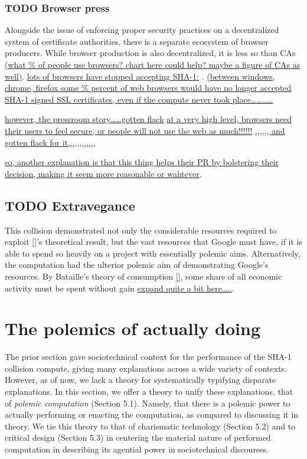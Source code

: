\documentclass[sigconf]{acmart}
\begin{document}
\subsubsection{{\bfseries\sffamily TODO} Browser press}
\label{sec:orgc9df00d}

Alongside the issue of enforcing proper security practices on a decentralized system of certificate authorities, 
there is a separate ecosystem of browser producers.
While browser production is also decentralized, it is less so than CAs
\uline{(what \% of people use browsers? chart here could help? maybe a figure of CAs as well)}.
\uline{lots of browsers have stopped accepting SHA-1:}
\cite{Sleevi2014,Mozilla2017}.
\uline{(between windows, chrome, firefox some \% percent of web browsers would have no longer accepted SHA-1 signed SSL certificates, even if the compute never took place\ldots{}\ldots{}\ldots{}\ldots{}}

\uline{however, the pressroom story\ldots{}\ldots{}gotten flack}
\uline{at a very high level, browsers need their users to feel secure, or people will not use the web as much!!!!!!}
\uline{,,,,,, and gotten flack for it,,,,,,,,,,,,}

\uline{so, another explanation is that this thing helps their PR by bolstering their decision, making it seem more reasonable or wahtever}.

\subsection{{\bfseries\sffamily TODO} Extravegance}
\label{sec:org3dd6240}

This collision demonstrated not only the considerable resources required to exploit \uline{[]}'s theoretical result,
but the vast resources that Google must have, if it is able to spend so heavily on a project with essentially polemic aims.
Alternatively, the computation had the ulterior polemic aim of demonstrating Google's resources.
By Bataille's theory of consumption \uline{[]}, some share of all economic activity must be spent without gain \uline{expand quite a bit here\ldots{}..}.


\section{The polemics of actually doing}
\label{sec:orgc14356b}

The prior section gave sociotechnical context for the performance of the SHA-1 collision compute,
giving many explanations across a wide variety of contexts.
However, as of now, we lack a theory for systematically typifying disparate explanations.
In this section, we offer a theory to unify these explanations, that of \emph{polemic computation} (Section 5.1).
Namely, that there is a polemic power to actually performing or enacting the computation,
as compared to discussing it in theory.
We tie this theory to that of charismatic technology (Section 5.2)
and to critical design (Section 5.3)
in centering the material nature of performed computation
in describing its agential power in sociotechnical discourses.
\end{document}
